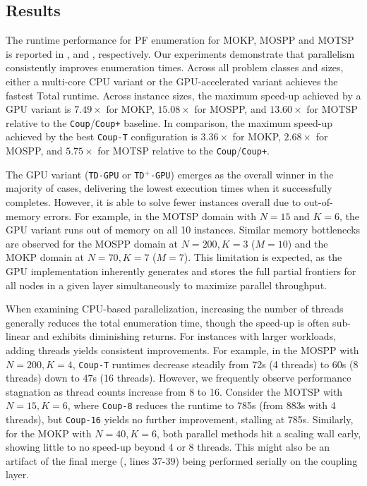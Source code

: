 \documentclass[letterpaper]{article}
\begin{document}
\subsection{Results}
The runtime performance for PF enumeration for MOKP, MOSPP and MOTSP is reported in ,  and , respectively. Our experiments demonstrate that parallelism consistently improves enumeration times. Across all problem classes and sizes, either a multi-core CPU variant or the GPU-accelerated variant achieves the fastest Total runtime. Across instance sizes, the maximum speed-up achieved by a GPU variant is $7.49\times$ for MOKP, $15.08\times$ for MOSPP, and $13.60\times$ for MOTSP relative to the \texttt{Coup}/\texttt{Coup+} baseline. 
In comparison, the maximum speed-up achieved by the best \texttt{Coup-T} configuration is $3.36\times$ for MOKP, $2.68\times$ for MOSPP, and $5.75\times$ for MOTSP relative to the \texttt{Coup}/\texttt{Coup+}.

The GPU variant (\texttt{TD-GPU} or \texttt{TD}$^+$\texttt{-GPU}) emerges as the overall winner in the majority of cases, delivering the lowest execution times when it successfully completes. However, it is able to solve fewer instances overall due to out-of-memory errors. For example, in the MOTSP domain with $N=15$ and $K=6$, the GPU variant runs out of memory on all 10 instances. Similar memory bottlenecks are observed for the MOSPP domain at $N=200, K=3$ ($M=10$) and the MOKP domain at $N=70, K=7$ ($M=7$). This limitation is expected, as the GPU implementation inherently generates and stores the full partial frontiers for all nodes in a given layer simultaneously to maximize parallel throughput.

When examining CPU-based parallelization, increasing the number of threads generally reduces the total enumeration time, though the speed-up is often sub-linear and exhibits diminishing returns. For instances with larger workloads, adding threads yields consistent improvements. For example, in the MOSPP with $N=200, K=4$, \texttt{Coup-T} runtimes decrease steadily from 72s (4 threads) to 60s (8 threads) down to 47s (16 threads). However, we frequently observe performance stagnation as thread counts increase from 8 to 16. Consider the MOTSP with $N=15, K=6$, where \texttt{Coup-8} reduces the runtime to 785s (from 883s with 4 threads), but \texttt{Coup-16} yields no further improvement, stalling at 785s. Similarly, for the MOKP with $N=40, K=6$, both parallel methods hit a scaling wall early, showing little to no speed-up beyond 4 or 8 threads. This might also be an artifact of the final merge (, lines 37-39) being performed serially on the coupling layer.
\end{document}
